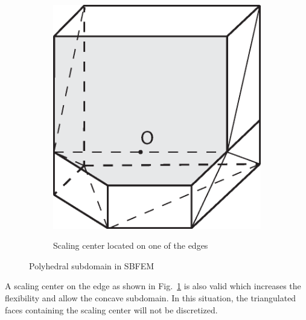 \begin{figure}
\begin{subfigure}[b]{0.48\linewidth}
{            \includegraphics{octree/images/sbfem3d_b.eps}
        }
        \caption{Scaling center located on one of the edges}
        \label{oct_fig:sbfem_intro_b}
    \end{subfigure}
    \caption[Polyhedral SBFEM subdomain in 3D]{Polyhedral subdomain in SBFEM}
    \label{oct_fig:sbfem_intro}
\end{figure}
%
A scaling center on the edge as shown in Fig.~\ref{oct_fig:sbfem_intro_b} is also valid which increases the flexibility and allow the concave subdomain.
In this situation, the triangulated faces containing the scaling center will not be discretized.

